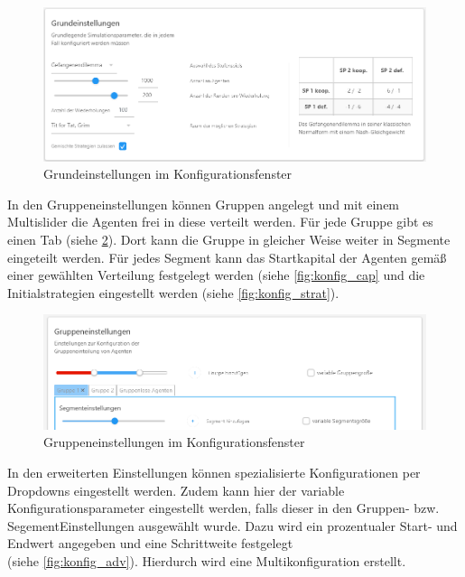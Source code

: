 \documentclass[parskip=full,11pt]{scrartcl}
\begin{document}
\begin{figure}[ht]
	\centering
	\includegraphics[width=\textwidth]{images/konfig_main.png}
	\caption{\label{fig:konfig_main}
		Grundeinstellungen im Konfigurationsfenster}
\end{figure}
\newpage
In den Gruppeneinstellungen können Gruppen angelegt und mit einem \Gls{Multislider} die Agenten frei in diese verteilt werden. Für jede Gruppe gibt es einen Tab (siehe \cref{fig:konfig_group}). Dort kann die Gruppe in gleicher Weise weiter in Segmente eingeteilt werden. Für jedes Segment kann das Startkapital der Agenten gemäß einer gewählten Verteilung festgelegt werden (siehe \cref{fig:konfig_cap} und die Initialstrategien eingestellt werden (siehe \cref{fig:konfig_strat}).



\begin{figure}[ht]
	\centering
	\includegraphics[width=\textwidth]{images/konfig_group.png}
	\caption{\label{fig:konfig_group}
		Gruppeneinstellungen im Konfigurationsfenster}
\end{figure}


In den erweiterten Einstellungen können spezialisierte Konfigurationen per Dropdowns eingestellt werden. Zudem kann hier der variable Konfigurationsparameter eingestellt werden, falls dieser in den Gruppen- bzw. SegementEinstellungen ausgewählt wurde. Dazu wird ein prozentualer Start- und Endwert angegeben und eine Schrittweite festgelegt \\(siehe \cref{fig:konfig_adv}). Hierdurch wird eine Multikonfiguration erstellt.
\end{document}
